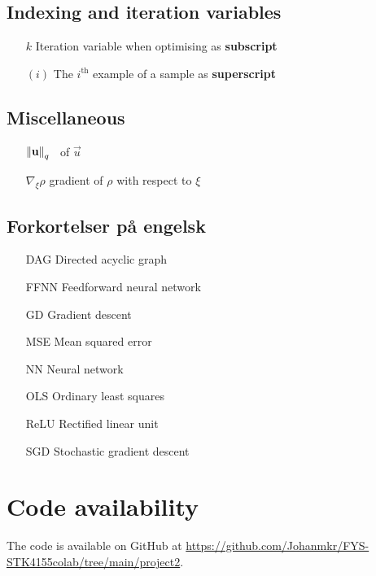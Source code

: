 \subsection{Indexing and iteration variables}
\begin{itemize}
    \item[$k$] Iteration variable when optimising as \textbf{subscript}
    \item[$(i)$] The $i^\mathrm{th}$ example of a sample as \textbf{superscript}
\end{itemize}


\subsection{Miscellaneous}

\begin{enumerate}[leftmargin=2.1em]
    \item[$\norm{\mathbf{u}}_q$] \lnorm[q]\, of $\vec{u}$
    \item[$\nabla_{\!\xi} \rho$] gradient of $\rho$ with respect to $\xi$
\end{enumerate}

\subsection{Forkortelser på engelsk}
\begin{enumerate}[leftmargin=2.6em]
    \item[DAG] Directed acyclic graph
    \item[FFNN] Feedforward neural network
    \item[GD] Gradient descent
    \item[MSE] Mean squared error 
    \item[NN] Neural network 
    \item[OLS] Ordinary least squares 
    \item[ReLU] Rectified linear unit
    \item[SGD] Stochastic gradient descent 
\end{enumerate}








\section*{Code availability}
The code is available on GitHub at \url{https://github.com/Johanmkr/FYS-STK4155colab/tree/main/project2}.





